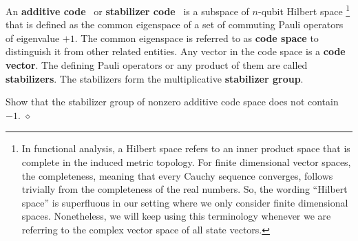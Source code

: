 An {\bf additive code}~\cite{CalderbankRainsShorSloane1998GF4,CalderbankRainsShorEtAl1997Quantum}
or {\bf stabilizer code}~\cite{Gottesman1996Saturating}
is a subspace of $n$-qubit Hilbert space%
\footnote{In functional analysis, 
a Hilbert space refers to an inner product space
that is complete in the induced metric topology.
For finite dimensional vector spaces,
the completeness, meaning that every Cauchy sequence converges,
follows trivially from the completeness of the real numbers.
So, the wording ``Hilbert space'' is superfluous in our setting
where we only consider finite dimensional spaces.
Nonetheless, we will keep using this terminology
whenever we are referring to the complex vector space of all state vectors.
}
that is defined as the common eigenspace of a set of commuting Pauli operators of eigenvalue $+1$.
The common eigenspace is referred to as {\bf code space} to distinguish it from other related entities.
Any vector in the code space is a {\bf code vector}.
The defining Pauli operators or any product of them are called {\bf stabilizers}.
The stabilizers form the multiplicative {\bf stabilizer group}.

\begin{exc}
Show that the stabilizer group of nonzero additive code space does not contain $-1$.
\label{NoMinusOne}
\hfill $\diamond$ \end{exc}


